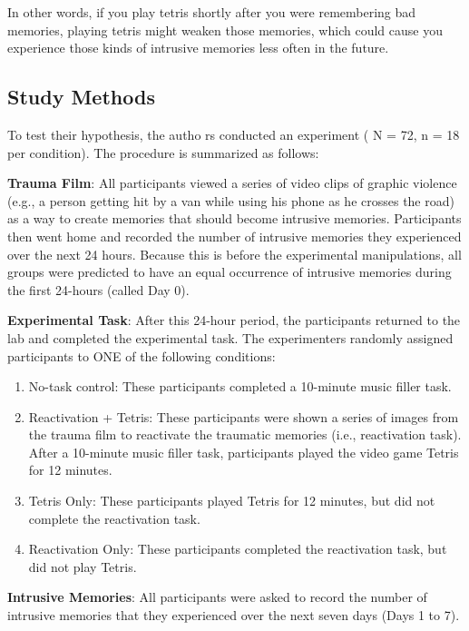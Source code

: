 \documentclass[]{book}
\providecommand{\tightlist}{%
  \setlength{\itemsep}{0pt}\setlength{\parskip}{0pt}}
\theoremstyle{definition}
\theoremstyle{definition}
\theoremstyle{definition}
\theoremstyle{remark}
\begin{document}
In other words, if you play tetris shortly after you were remembering
bad memories, playing tetris might weaken those memories, which could
cause you experience those kinds of intrusive memories less often in the
future.

\subsection{Study Methods}\label{study-methods}

To test their hypothesis, the autho rs conducted an experiment ( N = 72,
n = 18 per condition). The procedure is summarized as follows:

\textbf{Trauma Film}: All participants viewed a series of video clips of
graphic violence (e.g., a person getting hit by a van while using his
phone as he crosses the road) as a way to create memories that should
become intrusive memories. Participants then went home and recorded the
number of intrusive memories they experienced over the next 24 hours.
Because this is before the experimental manipulations, all groups were
predicted to have an equal occurrence of intrusive memories during the
first 24-hours (called Day 0).

\textbf{Experimental Task}: After this 24-hour period, the participants
returned to the lab and completed the experimental task. The
experimenters randomly assigned participants to ONE of the following
conditions:

\begin{enumerate}
\def\labelenumi{\arabic{enumi}.}
\tightlist
\item
  No-task control: These participants completed a 10-minute music filler
  task.
\item
  Reactivation + Tetris: These participants were shown a series of
  images from the trauma film to reactivate the traumatic memories
  (i.e., reactivation task). After a 10-minute music filler task,
  participants played the video game Tetris for 12 minutes.
\item
  Tetris Only: These participants played Tetris for 12 minutes, but did
  not complete the reactivation task.
\item
  Reactivation Only: These participants completed the reactivation task,
  but did not play Tetris.
\end{enumerate}

\textbf{Intrusive Memories}: All participants were asked to record the
number of intrusive memories that they experienced over the next seven
days (Days 1 to 7).
\end{document}
